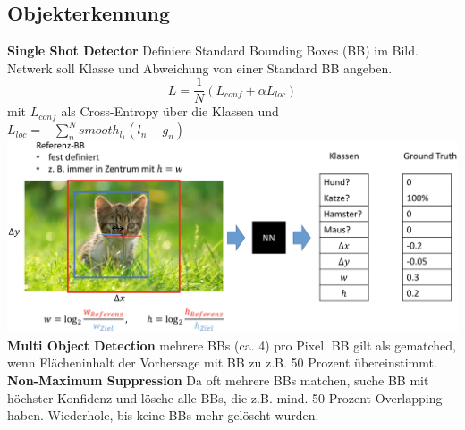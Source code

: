 \documentclass[12pt]{article}
\begin{document}
	\subsection{Objekterkennung}
	\textbf{Single Shot Detector} Definiere Standard Bounding Boxes (BB) im Bild. Netwerk soll Klasse und Abweichung von einer Standard BB angeben.
	$$L = \frac{1}{N} (L_{conf} + \alpha L_{loc})$$
	mit $L_{conf}$ als Cross-Entropy über die Klassen und $L_{loc} = - \sum_n^N smooth_{l_1}(l_n - g_n)$\\
	\includegraphics[width=\linewidth]{figures/single-shot-detector.png}\\
	\textbf{Multi Object Detection} mehrere BBs (ca. 4) pro Pixel. BB gilt als gematched, wenn Flächeninhalt der Vorhersage mit BB zu z.B. 50 Prozent übereinstimmt.\\
	\textbf{Non-Maximum Suppression} Da oft mehrere BBs matchen, suche BB mit höchster Konfidenz und lösche alle BBs, die z.B. mind. 50 Prozent Overlapping haben. Wiederhole, bis keine BBs mehr gelöscht wurden.
\end{document}
